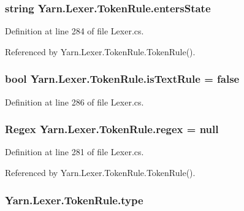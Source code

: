 \hypertarget{a00176_af6a4bd3416c4e1b8e56f9db461d52d18}{
\subsubsection[{enters\-State}]{\setlength{\rightskip}{0pt plus 5cm}string Yarn.\-Lexer.\-Token\-Rule.\-enters\-State}}\label{a00176_af6a4bd3416c4e1b8e56f9db461d52d18}


Definition at line 284 of file Lexer.\-cs.



Referenced by Yarn.\-Lexer.\-Token\-Rule.\-Token\-Rule().

\hypertarget{a00176_a09f49e6edf9ace38a92d723998181f8f}{
\subsubsection[{is\-Text\-Rule}]{\setlength{\rightskip}{0pt plus 5cm}bool Yarn.\-Lexer.\-Token\-Rule.\-is\-Text\-Rule = false}}\label{a00176_a09f49e6edf9ace38a92d723998181f8f}


Definition at line 286 of file Lexer.\-cs.

\hypertarget{a00176_a47a404d6637fae489c3c77729a01cc69}{
\subsubsection[{regex}]{\setlength{\rightskip}{0pt plus 5cm}Regex Yarn.\-Lexer.\-Token\-Rule.\-regex = null}}\label{a00176_a47a404d6637fae489c3c77729a01cc69}


Definition at line 281 of file Lexer.\-cs.



Referenced by Yarn.\-Lexer.\-Token\-Rule.\-Token\-Rule().

\hypertarget{a00176_a0de6fac3b55cf0c61e07cea53ce67caa}{
\subsubsection[{type}]{ Yarn.\-Lexer.\-Token\-Rule.\-type}}\label{a00176_a0de6fac3b55cf0c61e07cea53ce67caa}


